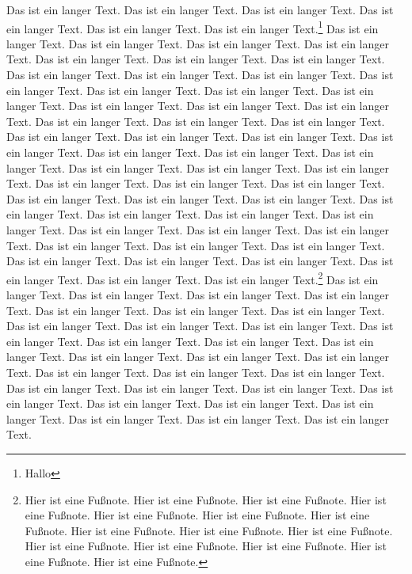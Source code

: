 \documentclass{article}
\begin{document}
Das ist ein langer Text. Das ist ein langer Text.
Das ist ein langer Text. Das ist ein langer Text.
Das ist ein langer Text. Das ist ein langer Text.\footnote{Hallo}
Das ist ein langer Text. Das ist ein langer Text.
Das ist ein langer Text. Das ist ein langer Text.
Das ist ein langer Text. Das ist ein langer Text.
Das ist ein langer Text. Das ist ein langer Text.
Das ist ein langer Text. Das ist ein langer Text.
Das ist ein langer Text. Das ist ein langer Text.
Das ist ein langer Text. Das ist ein langer Text.
Das ist ein langer Text. Das ist ein langer Text.
Das ist ein langer Text. Das ist ein langer Text.
Das ist ein langer Text. Das ist ein langer Text.
Das ist ein langer Text. Das ist ein langer Text.
Das ist ein langer Text. Das ist ein langer Text.
Das ist ein langer Text. Das ist ein langer Text.
Das ist ein langer Text. Das ist ein langer Text.
Das ist ein langer Text. Das ist ein langer Text.
Das ist ein langer Text. Das ist ein langer Text.
Das ist ein langer Text. Das ist ein langer Text.
Das ist ein langer Text. Das ist ein langer Text.
Das ist ein langer Text. Das ist ein langer Text.
Das ist ein langer Text. Das ist ein langer Text.
Das ist ein langer Text. Das ist ein langer Text.
Das ist ein langer Text. Das ist ein langer Text.
Das ist ein langer Text. Das ist ein langer Text.
Das ist ein langer Text. Das ist ein langer Text.
Das ist ein langer Text. Das ist ein langer Text.
Das ist ein langer Text. Das ist ein langer Text.\footnote{%
  Hier ist eine Fu\ss note. Hier ist eine Fu\ss note.
  Hier ist eine Fu\ss note. Hier ist eine Fu\ss note.
  Hier ist eine Fu\ss note. Hier ist eine Fu\ss note.
  Hier ist eine Fu\ss note. Hier ist eine Fu\ss note.
  Hier ist eine Fu\ss note. Hier ist eine Fu\ss note.
  Hier ist eine Fu\ss note. Hier ist eine Fu\ss note.
  Hier ist eine Fu\ss note. Hier ist eine Fu\ss note.
  Hier ist eine Fu\ss note.}
Das ist ein langer Text. Das ist ein langer Text.
Das ist ein langer Text. Das ist ein langer Text.
Das ist ein langer Text. Das ist ein langer Text.
Das ist ein langer Text. Das ist ein langer Text.
Das ist ein langer Text. Das ist ein langer Text.
Das ist ein langer Text. Das ist ein langer Text.
Das ist ein langer Text. Das ist ein langer Text.
Das ist ein langer Text. Das ist ein langer Text.
Das ist ein langer Text. Das ist ein langer Text.
Das ist ein langer Text. Das ist ein langer Text.
Das ist ein langer Text. Das ist ein langer Text.
Das ist ein langer Text. Das ist ein langer Text.
Das ist ein langer Text. Das ist ein langer Text.
Das ist ein langer Text. Das ist ein langer Text.
Das ist ein langer Text. Das ist ein langer Text.
\end{document}
